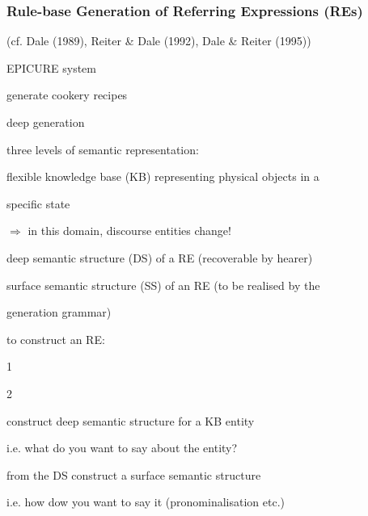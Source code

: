 \documentclass[compress,color=usenames]{beamer}
\begin{document}
\begin{frame}
\frametitle{
Rule-base Generation of Referring Expressions (REs)}



(cf. Dale (1989), Reiter \& Dale (1992), Dale \& Reiter (1995))






EPICURE system



generate cookery recipes



deep generation



three levels of semantic representation:



ﬂexible knowledge base (KB) representing physical objects in a



speciﬁc state



$\Rightarrow$ in this domain, discourse entities change!



deep semantic structure (DS) of a RE (recoverable by hearer)



surface semantic structure (SS) of an RE (to be realised by the



generation grammar)






to construct an RE:


1





2


construct deep semantic structure for a KB entity



i.e. what do you want to say about the entity?



from the DS construct a surface semantic structure



i.e. how dow you want to say it (pronominalisation etc.)











\end{frame}
\end{document}
